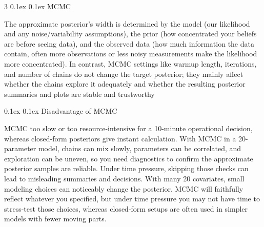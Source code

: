 \documentclass[8pt,landscape]{article}
\makeatletter
\renewcommand{\section}{\@startsection{section}{2}{0pt}%
    {0.1ex}%
    {0.1ex}%
    {\fontsize{8}{9}\bfseries\color{red}}} %
\renewcommand{\subsection}{\@startsection{subsection}{2}{0pt}%
    {0.1ex}%
    {0.1ex}%
    {\fontsize{8}{9}\bfseries\color{blue}}} %
\newcommand{\smalltext}[1]{
  {\fontsize{8}{9}\selectfont\sloppy #1\par}
}
\makeatother
\begin{document}
\begin{multicols}{3}
\section{MCMC}
\smalltext{
  The approximate posterior's width is determined by the model (our likelihood and any
  noise/variability assumptions), the prior (how concentrated your beliefs are before seeing data), and the
  observed data (how much information the data contain, often more observations or less noisy measurements
  make the likelihood more concentrated). In contrast, MCMC settings like warmup length, iterations, and
  number of chains do not change the target posterior; they mainly affect whether the chains explore it
  adequately and whether the resulting posterior summaries and plots are stable and trustworthy
}
\subsection{Disadvantage of MCMC}
\smalltext{
  MCMC too slow or too resource-intensive for a 10-minute operational decision, whereas closed-form posteriors give instant calculation.
  With MCMC in a 20-parameter model, chains can mix slowly, parameters can be correlated, and exploration can be uneven, so you
  need diagnostics to confirm the approximate posterior samples are reliable. Under time pressure,
  skipping those checks can lead to misleading summaries and decisions. 
  With many 20 covariates, small modeling choices can noticeably change the posterior. MCMC will faithfully
  reflect whatever you specified, but under time pressure you may not have time to stress-test those
  choices, whereas closed-form setups are often used in simpler models with fewer moving parts.

}







\end{multicols}
\end{document}
